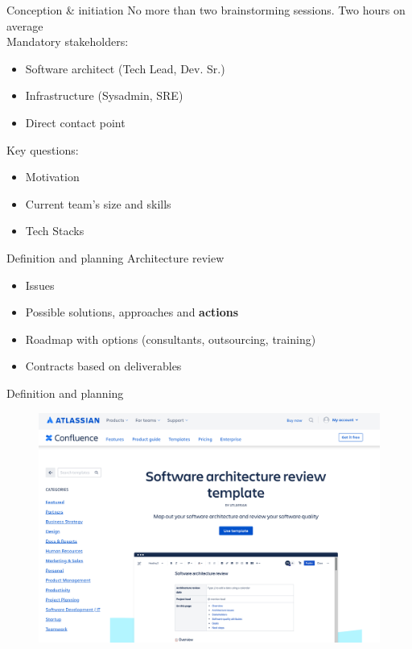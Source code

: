 \documentclass[aspectratio=169]{beamer}
\begin{document}
\begin{frame}{Conception \& initiation}
No more than two brainstorming sessions. Two hours on average\\

Mandatory stakeholders:\\
\begin{itemize}
\item Software architect (Tech Lead, Dev. Sr.)
\item Infrastructure (Sysadmin, SRE)
\item Direct contact point
\end{itemize}

Key questions:\\
\begin{itemize}
\item Motivation
\item Current team's size and skills
\item Tech Stacks
\end{itemize}
\end{frame}

\begin{frame}{Definition and planning}
Architecture review
\begin{itemize}
\item Issues
\item Possible solutions, approaches and \textbf{actions}
\item Roadmap with options (consultants, outsourcing, training)
\item Contracts based on deliverables
\end{itemize}
\end{frame}

\begin{frame}{Definition and planning}
\begin{figure}
\centering
\includegraphics[width=0.7\linewidth]{Images/atlassian}
\end{figure}
\end{frame}
\end{document}
